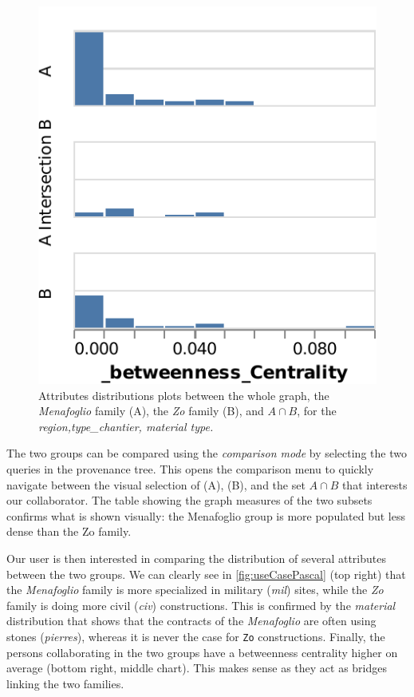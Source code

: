 \begin{figure}[!ht]
     \includegraphics[width=0.34\linewidth]{static/figures/ComBiNet/OriginalPaperFigures/CGF/MenaZoPlots/v2/BC_crop.pdf}

    \caption{Attributes distributions plots between the whole graph, the \textit{Menafoglio} family (A), the \textit{Zo} family (B), and $A\cap B$, for the \textit{region,type\_chantier,  material type.}
    \label{fig:useCasePascal}}
\end{figure}
The two groups can be compared using the \textit{comparison mode} by selecting the two queries in the provenance tree. This opens the comparison menu to quickly navigate between the visual selection of (A), (B), and the set $A \cap B$ that interests our collaborator. The table showing the graph measures of the two subsets confirms what is shown visually: the Menafoglio group is more populated but less dense than the Zo family.

Our user is then interested in comparing the distribution of several attributes between the two groups. We can clearly see in \autoref{fig:useCasePascal} (top right) that the \textit{Menafoglio} family is more specialized in military (\textit{mil}) sites, while the \textit{Zo} family is doing more civil (\textit{civ}) constructions. This is confirmed by the \textit{material} distribution that shows that the contracts of the \textit{Menafoglio} are often using stones (\textit{pierres}), whereas it is never the case for \texttt{Zo} constructions.
Finally, the persons collaborating in the two groups have a betweenness centrality higher on average (bottom right, middle chart).
This makes sense as they act as bridges linking the two families.







